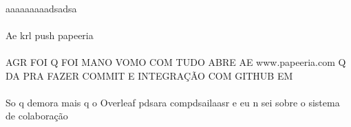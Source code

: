 \documentclass[12pt]{article}
\begin{document}
\paragraph{}aaaaaaaaadsadsa
\paragraph{}Ae krl push papeeria
\paragraph{}AGR FOI Q FOI MANO VOMO COM TUDO ABRE AE www.papeeria.com Q DA PRA FAZER COMMIT E INTEGRAÇÃO COM GITHUB EM

\paragraph{}So q demora mais q o Overleaf pdsara compdsailaasr e eu n sei sobre o sistema de colaboração
\end{document}
